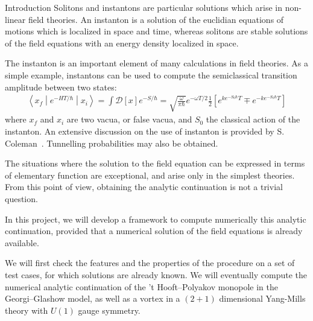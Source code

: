 \begin{section}{Introduction}
  Solitons and instantons are particular solutions which arise in
  non-linear field theories. An instanton is a solution of the
  euclidian equations of motions which is localized in space
  and time, whereas solitons are stable solutions of the field
  equations with an energy density localized in space.
  
  The instanton is an important element of many calculations in field
  theories. As a simple example, instantons can be used to compute the
  semiclassical transition amplitude between two states:
  \begin{align*}
    \left\langle x_f\middle|e^{-HT/\hbar}\middle|x_i\right\rangle = \int \mathcal D[x]e^{-S/\hbar} = \sqrt{\frac{\omega}{\pi\hbar}}e^{-\omega T/2}\frac{1}{2}\left[e^{ke^{-S_0\hbar}T}\mp e^{-ke^{-S_0\hbar}T}\right]
  \end{align*}
  where $x_f$ and $x_i$ are two vacua, or false vacua, and $S_0$ the
  classical action of the instanton. An extensive discussion on the
  use of instanton is provided by S. Coleman~\cite{col}. Tunnelling
  probabilities may also be obtained.
  
  The situations where the solution to the field equation can be
  expressed in terms of elementary function are exceptional, and arise
  only in the simplest theories. From this point of view, obtaining
  the analytic continuation is not a trivial question.

  In this project, we will develop a framework to compute numerically
  this analytic continuation, provided that a numerical solution of
  the field equations is already available.
  
  We will first check the features and the properties of the procedure
  on a set of test cases, for which solutions are already known. We will
  eventually compute the numerical analytic continuation of the 't
  Hooft--Polyakov monopole in the Georgi--Glashow model, as well as a
  vortex in a $(2+1)$ dimensional Yang-Mills theory with $U(1)$ gauge
  symmetry.

  

\end{section}
